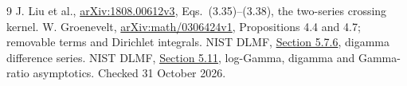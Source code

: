 \documentclass[11pt,a4paper]{article}
\begin{document}
\begin{thebibliography}{9}
 J. Liu et al.,
\href{https://arxiv.org/html/1808.00612v3}{arXiv:1808.00612v3},
Eqs.\ (3.35)--(3.38), the two-series crossing kernel.
 W. Groenevelt,
\href{https://arxiv.org/html/math/0306424v1}{arXiv:math/0306424v1},
Propositions 4.4 and 4.7; removable terms and Dirichlet integrals.
 NIST DLMF,
\href{https://dlmf.nist.gov/5.7}{Section 5.7.6}, digamma difference series.
 NIST DLMF,
\href{https://dlmf.nist.gov/5.11}{Section 5.11}, log-Gamma, digamma
and Gamma-ratio asymptotics. Checked 31 October 2026.
\end{thebibliography}
\end{document}
